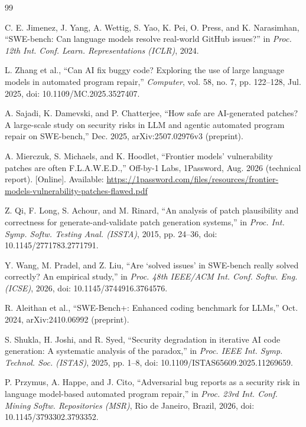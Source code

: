 \documentclass[10pt,journal,compsoc]{IEEEtran}
\begin{document}
\begin{thebibliography}{99}
\small

C. E. Jimenez, J. Yang, A. Wettig, S. Yao, K. Pei, O. Press, and K. Narasimhan,
``SWE-bench: Can language models resolve real-world GitHub issues?'' in
\emph{Proc. 12th Int. Conf. Learn. Representations (ICLR)}, 2024.

L. Zhang et al., ``Can AI fix buggy code?
Exploring the use of large language models in automated program repair,''
\emph{Computer}, vol. 58, no. 7, pp. 122--128, Jul. 2025,
doi: 10.1109/MC.2025.3527407.

A. Sajadi, K. Damevski, and P. Chatterjee, ``How safe are AI-generated patches?
A large-scale study on security risks in LLM and agentic automated program
repair on SWE-\allowbreak bench,'' Dec. 2025, arXiv:2507.02976v3 (preprint).

A. Mierczuk, S. Michaels, and K. Hoodlet, ``Frontier models' vulnerability
patches are often F.L.A.W.E.D.,'' Off-by-1 Labs, 1Password, Aug. 2026
(technical report). [Online]. Available:
\url{https://1password.com/files/resources/frontier-models-vulnerability-patches-flawed.pdf}

Z. Qi, F. Long, S. Achour, and M. Rinard, ``An analysis of patch plausibility
and correctness for generate-and-validate patch generation systems,'' in
\emph{Proc. Int. Symp. Softw. Testing Anal. (ISSTA)}, 2015, pp. 24--36,
doi: 10.1145/2771783.2771791.

Y. Wang, M. Pradel, and Z. Liu, ``Are `solved issues' in SWE-bench really
solved correctly? An empirical study,'' in \emph{Proc. 48th IEEE/ACM Int. Conf.
Softw. Eng. (ICSE)}, 2026, doi: 10.1145/3744916.3764576.

R. Aleithan et al., ``SWE-Bench+: Enhanced coding benchmark for LLMs,''
Oct. 2024, arXiv:2410.06992 (preprint).

S. Shukla, H. Joshi, and R. Syed, ``Security degradation in iterative AI code
generation: A systematic analysis of the paradox,'' in \emph{Proc. IEEE Int.
Symp. Technol. Soc. (ISTAS)}, 2025, pp. 1--8,
doi: 10.1109/ISTAS65609.2025.11269659.

P. Przymus, A. Happe, and J. Cito, ``Adversarial bug reports as a security
risk in language model-based automated program repair,'' in \emph{Proc. 23rd
Int. Conf. Mining Softw. Repositories (MSR)}, Rio de Janeiro, Brazil, 2026,
doi: 10.1145/3793302.3793352.


\end{thebibliography}
\end{document}
